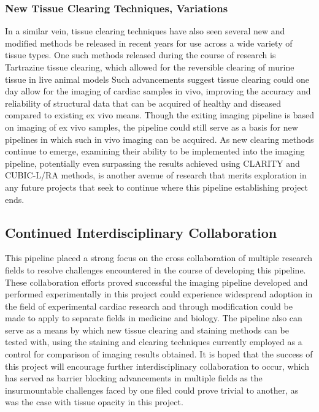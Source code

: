 \subsubsection{New Tissue Clearing Techniques, Variations}
In a similar vein, tissue clearing techniques have also seen several new and modified methods be released in recent years for use across a wide variety of tissue types. One such methods released during the course of research is Tartrazine tissue clearing, which allowed for the reversible clearing of murine tissue in live animal models \cite{ou_achieving_2024} Such advancements suggest tissue clearing could one day allow for the imaging of cardiac samples in vivo, improving the accuracy and reliability of structural data that can be acquired of healthy and diseased compared to existing ex vivo means. Though the exiting imaging pipeline is based on imaging of ex vivo samples, the pipeline could still serve as a basis for new pipelines in which such in vivo imaging can be acquired. As new clearing methods continue to emerge, examining their ability to be implemented into the imaging pipeline, potentially even surpassing the results achieved using CLARITY and CUBIC-L/RA methods, is another avenue of research that merits exploration in any future projects that seek to continue where this pipeline establishing project ends. 

\subsection{Continued Interdisciplinary Collaboration}
This pipeline placed a strong focus on the cross collaboration of multiple research fields to resolve challenges encountered in the course of developing this pipeline. These collaboration efforts proved successful the imaging pipeline developed and performed experimentally in this project could experience widespread adoption in the field of experimental cardiac research and through modification could be made to apply to separate fields in medicine and biology. The pipeline also can serve as a means by which new tissue clearing and staining methods can be tested with, using the staining and clearing techniques currently employed as a control for comparison of imaging results obtained. It is hoped that the success of this project will encourage further interdisciplinary collaboration to occur, which has served as barrier blocking advancements in multiple fields as the insurmountable challenges faced by one filed could prove trivial to another, as was the case with tissue opacity in this project. 

